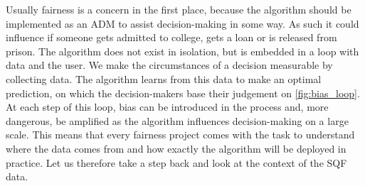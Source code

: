 Usually fairness is a concern in the first place, because the algorithm should be implemented as an ADM to assist decision-making in some way. As such it could influence if someone gets admitted to college, gets a loan or is released from prison. The algorithm does not exist in isolation, but is embedded in a loop with data and the user.
We make the circumstances of a decision measurable by collecting data. The algorithm learns from this data to make an optimal prediction, on which the decision-makers base their judgement on \autoref{fig:bias_loop}. At each step of this loop, bias can be introduced in the process and, more dangerous, be amplified as the algorithm influences decision-making on a large scale.
This means that every fairness project comes with the task to understand where the data comes from and how exactly the algorithm will be deployed in practice. Let us therefore take a step back and look at the context of the SQF data.







